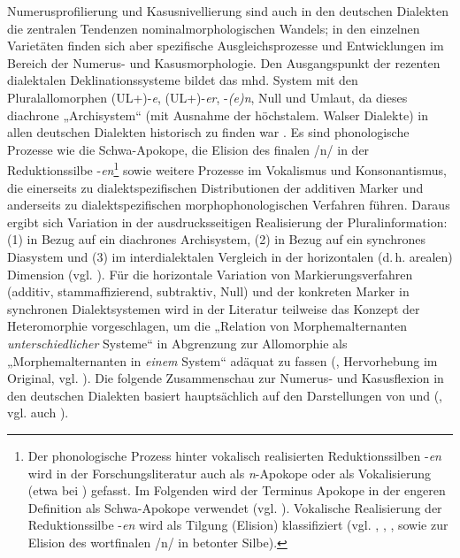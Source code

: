 Numerusprofilierung und Kasusnivellierung sind auch in den deutschen Dialekten die zentralen Tendenzen nominalmorphologischen Wandels; in den einzelnen Varietäten finden sich aber spezifische Ausgleichsprozesse und Entwicklungen im Bereich der Numerus- und Kasusmorphologie. Den Ausgangspunkt der rezenten dialektalen Deklinationssysteme bildet das mhd. System mit den Pluralallomorphen (UL+)-\textit{e}, (UL+)-\textit{er}, -\textit{(e)n}, Null und Umlaut, da dieses diachrone „Archisystem“ (mit Ausnahme der höchstalem. Walser Dialekte) in allen deutschen Dialekten historisch zu finden war \citep[1196]{Dingeldein1983}. Es sind phonologische Prozesse wie die Schwa-Apokope, die Elision des finalen /n/ in der Reduktionssilbe -\textit{en}\footnote{Der phonologische Prozess hinter vokalisch realisierten Reduktionssilben -\textit{en} wird in der Forschungsliteratur auch als \textit{n}{}-Apokope oder als Vokalisierung (etwa bei \citealt{Rowley1997}) gefasst. Im Folgenden wird der Terminus Apokope in der engeren Definition als Schwa-Apokope verwendet (vgl. \citealt[132]{Birkenes2014}). Vokalische Realisierung der Reduktionssilbe -\textit{en} wird als Tilgung (Elision) klassifiziert (vgl. \citealt{Dingeldein1983}, \citealt{Kranzmayer1956}, \citealt{Schirmunski1962}, \citealt{SMF4} sowie  zur Elision des wortfinalen /n/ in betonter Silbe).} sowie weitere Prozesse im Vokalismus und Konsonantismus, die einerseits zu dialektspezifischen Distributionen der additiven Marker und anderseits zu dialektspezifischen morphophonologischen Verfahren führen. Daraus ergibt sich Variation in der ausdrucksseitigen Realisierung der Pluralinformation: (1) in Bezug auf ein diachrones Archisystem, (2) in Bezug auf ein synchrones Diasystem und (3) im interdialektalen Vergleich in der horizontalen (d.\,h. arealen) Dimension (vgl. \citealt[806]{Rabanus2010}). Für die horizontale Variation von Markierungsverfahren (additiv, stammaffizierend, subtraktiv, Null) und der konkreten Marker in synchronen Dialektsystemen wird in der Literatur teilweise das Konzept der Heteromorphie vorgeschlagen, um die „Relation von Morphemalternanten \textit{unterschiedlicher} Systeme“ in Abgrenzung zur Allomorphie als „Morphemalternanten in \textit{einem} System“ adäquat zu fassen (\citealt[129]{Koch2006}, Hervorhebung im Original, vgl. \citealt[130--131]{Girnth2006}). Die folgende Zusammenschau zur Numerus- und Kasusflexion in den deutschen Dialekten basiert hauptsächlich auf den Darstellungen von \citet{Dingeldein1983} und \citeauthor{Schirmunski1962} (\citeyear{Schirmunski1962}, vgl. auch \citealt[622--623]{Rabanus2019}).

